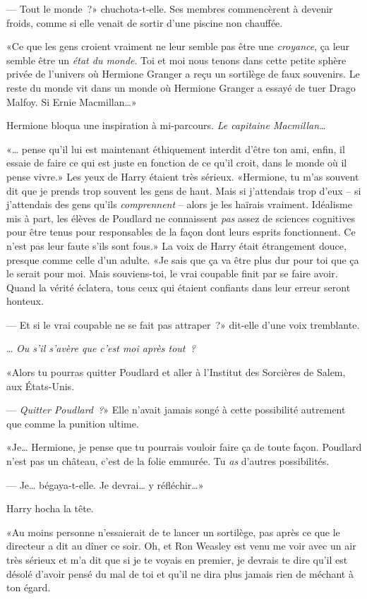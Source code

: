 --- Tout le monde~?» chuchota-t-elle. Ses membres commencèrent à devenir froids, comme si elle venait de sortir d'une piscine non chauffée.

«Ce que les gens croient vraiment ne leur semble pas être une \emph{croyance}, ça leur semble être un \emph{état du monde}. Toi et moi nous tenons dans cette petite sphère privée de l'univers où Hermione Granger a reçu un sortilège de faux souvenirs. Le reste du monde vit dans un monde où Hermione Granger a essayé de tuer Drago Malfoy. Si Ernie Macmillan…»

Hermione bloqua une inspiration à mi-parcours. \emph{Le capitaine Macmillan…}

«… pense qu'il lui est maintenant éthiquement interdit d'être ton ami, enfin, il essaie de faire ce qui est juste en fonction de ce qu'il croit, dans le monde où il pense vivre.» Les yeux de Harry étaient très sérieux. «Hermione, tu m'as souvent dit que je prends trop souvent les gens de haut. Mais si j'attendais trop d'eux -- si j'attendais des gens qu'ils \emph{comprennent} -- alors je les haïrais vraiment. Idéalisme mis à part, les élèves de Poudlard ne connaissent \emph{pas} assez de sciences cognitives pour être tenus pour responsables de la façon dont leurs esprits fonctionnent. Ce n'est pas leur faute s'ils sont fous.» La voix de Harry était étrangement douce, presque comme celle d'un adulte. «Je sais que ça va être plus dur pour toi que ça le serait pour moi. Mais souviens-toi, le vrai coupable finit par se faire avoir. Quand la vérité éclatera, tous ceux qui étaient confiants dans leur erreur seront honteux.

--- Et si le vrai coupable ne se fait pas attraper~?» dit-elle d'une voix tremblante.

… \emph{Ou s'il s'avère que c'est moi après tout~?}

«Alors tu pourras quitter Poudlard et aller à l'Institut des Sorcières de Salem, aux États-Unis.

--- \emph{Quitter Poudlard~?}» Elle n'avait jamais songé à cette possibilité autrement que comme la punition ultime.

«Je… Hermione, je pense que tu pourrais vouloir faire ça de toute façon. Poudlard n'est pas un château, c'est de la folie emmurée. Tu \emph{as} d'autres possibilités.

--- Je… bégaya-t-elle. Je devrai… y réfléchir…»

Harry hocha la tête.

«Au moins personne n'essaierait de te lancer un sortilège, pas après ce que le directeur a dit au dîner ce soir. Oh, et Ron Weasley est venu me voir avec un air très sérieux et m'a dit que si je te voyais en premier, je devrais te dire qu'il est désolé d'avoir pensé du mal de toi et qu'il ne dira plus jamais rien de méchant à ton égard.

